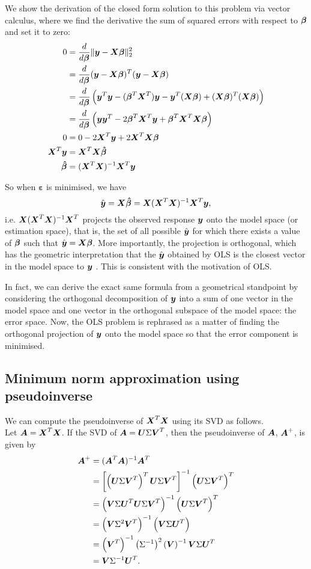 \documentclass[12pt]{article}
\newcommand{\Sg}{\Sigma}
\newcommand{\gbh}{\hat{\gb}}
\newcommand{\bmgb}{\boldsymbol{\gb}}
\newcommand{\bmge}{\boldsymbol{\varepsilon}}
\newcommand{\bmgbh}{\boldsymbol{\gbh}}
\begin{document}
	We show the derivation of the closed form solution to this problem via vector calculus, where we find the derivative the sum of squared errors with respect to $\bmgb$ and set it to zero:
	 \begin{align}
	 	0&=\frac{d}{d\bmgb}\|\bmy-\bmX\bmgb\|_2^2\\
	 	&=\frac{d}{d\bmgb}(\bmy-\bmX\bmgb)^T(\bmy-\bmX\bmgb)\\
	 	&=\frac{d}{d\bmgb}\lt(\bmy^T\bmy-(\bmgb^T\bmX^T)\bmy-\bmy^T(\bmX\bmgb)+(\bmX\bmgb)^T(\bmX\bmgb)\rt)\\
	 	&=\frac{d}{d\bmgb}\lt(\bmy\bmy^T-2\bmgb^T\bmX^T\bmy+\bmgb^T\bmX^T\bmX\bmgb\rt)\\
	 	0&=0-2\bmX^T\bmy+2\bmX^T\bmX\bmgb\\
	 	\bmX^T\bmy&=\bmX^T\bmX\bmgbh\\
	 	\bmgbh&=(\bmX^T\bmX)^{-1}\bmX^T\bmy
	 \end{align}
	 
	So when $\bmge$ is minimised, we have
	\begin{equation}
		\hat{\bmy}=\bmX\bmgbh=\bmX(\bmX^T\bmX)^{-1}\bmX^T\bmy,
	\end{equation}
	i.e. $\boldsymbol{X}(\boldsymbol{X}^T\boldsymbol{X})^{-1}\boldsymbol{X}^T$ projects the observed response $\boldsymbol{y}$ onto the model space (or estimation space), that is, the set of all possible $\hat{\boldsymbol{y}}$ for which there exists a value of $\bmgb$ such that $\hat{\bmy}=\bmX\bmgb$. More importantly, the projection is orthogonal, which has the geometric interpretation that the $\hat{\boldsymbol{y}}$ obtained by OLS is the closest vector in the model space to $\boldsymbol{y}$ \cite{Agresti2015}. This is consistent with the motivation of OLS.\\
	\pagebreak
	
	In fact, we can derive the exact same formula from a geometrical standpoint by considering the orthogonal decomposition of $\boldsymbol{y}$ into a sum of one vector in the model space and one vector in the orthogonal subspace of the model space: the error space. Now, the OLS problem is rephrased as a matter of finding the orthogonal projection of $\boldsymbol{y}$ onto the model space so that the error component is minimised.
	\subsection{Minimum norm approximation using pseudoinverse\label{sec:append2}}
	We can compute the pseudoinverse of $\boldsymbol{X}^T\boldsymbol{X}$ using its SVD as follows.\\
	
	Let $\boldsymbol{A}=\boldsymbol{X}^T\boldsymbol{X}$. If the SVD of $\bmA=\bmU\Sg\bmV^T$, then the pseudoinverse of $\boldsymbol{A}$, $\boldsymbol{A}^+$, is given by
	\begin{align}
		\bmA^+&=(\bmA^T\bmA)^{-1}\bmA^T\\
		&=\lt[\lt(\bmU\Sg\bmV^T\rt)^T\bmU\Sg\bmV^T\rt]^{-1}\lt(\bmU\Sg\bmV^T\rt)^T\\
		&=\lt(\bmV\Sg\bmU^T\bmU\Sg\bmV^T\rt)^{-1}\lt(\bmU\Sg\bmV^T\rt)^T\\
		&=\lt(\bmV\Sg^2\bmV^T\rt)^{-1}\lt(\bmV\Sg\bmU^T\rt)\\
		&=\lt(\bmV^T\rt)^{-1}\lt(\Sg^{-1}\rt)^2\lt(\bmV\rt)^{-1}\bmV\Sg\bmU^T\\
		&=\bmV\Sg^{-1}\bmU^T.
	\end{align}
	
\end{document}
